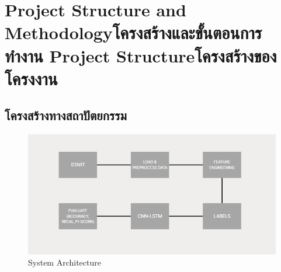 \chapter{\ifproject%
\ifenglish Project Structure and Methodology\else โครงสร้างและขั้นตอนการทำงาน\fi
\else%
\ifenglish Project Structure\else โครงสร้างของโครงงาน\fi
\fi
}

\makeatletter


\makeatother

\section{โครงสร้างทางสถาปัตยกรรม}

\begin{figure}[h]
\begin{center}
\includegraphics[width=\textwidth]{Image/System Architecture.png}
\end{center}
\caption[System Architecture]{System Architecture}
\label{fig:System Architecture}
\end{figure}

